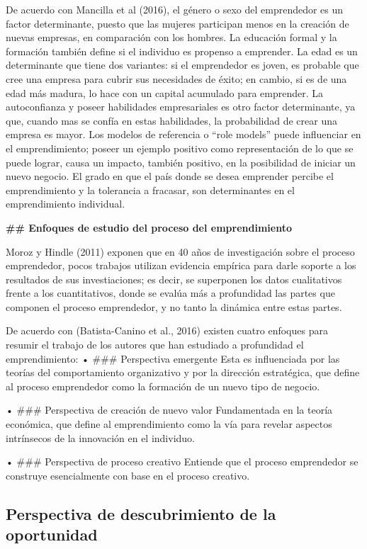 \documentclass[
  letterpaper,
  DIV=11,
  numbers=noendperiod]{scrreprt}
\begin{document}
De acuerdo con Mancilla et al (2016), el género o sexo del emprendedor
es un factor determinante, puesto que las mujeres participan menos en la
creación de nuevas empresas, en comparación con los hombres. La
educación formal y la formación también define si el individuo es
propenso a emprender. La edad es un determinante que tiene dos
variantes: si el emprendedor es joven, es probable que cree una empresa
para cubrir sus necesidades de éxito; en cambio, si es de una edad más
madura, lo hace con un capital acumulado para emprender. La
autoconfianza y poseer habilidades empresariales es otro factor
determinante, ya que, cuando mas se confía en estas habilidades, la
probabilidad de crear una empresa es mayor. Los modelos de referencia o
``role models'' puede influenciar en el emprendimiento; poseer un
ejemplo positivo como representación de lo que se puede lograr, causa un
impacto, también positivo, en la posibilidad de iniciar un nuevo
negocio. El grado en que el país donde se desea emprender percibe el
emprendimiento y la tolerancia a fracasar, son determinantes en el
emprendimiento individual.

\textbf{\#\# Enfoques de estudio del proceso del emprendimiento}

Moroz y Hindle (2011) exponen que en 40 años de investigación sobre el
proceso emprendedor, pocos trabajos utilizan evidencia empírica para
darle soporte a los resultados de sus investiaciones; es decir, se
superponen los datos cualitativos frente a los cuantitativos, donde se
evalúa más a profundidad las partes que componen el proceso emprendedor,
y no tanto la dinámica entre estas partes.

De acuerdo con (Batista-Canino et al., 2016) existen cuatro enfoques
para resumir el trabajo de los autores que han estudiado a profundidad
el emprendimiento: • \#\#\# Perspectiva emergente Esta es influenciada
por las teorías del comportamiento organizativo y por la dirección
estratégica, que define al proceso emprendedor como la formación de un
nuevo tipo de negocio.

• \#\#\# Perspectiva de creación de nuevo valor Fundamentada en la
teoría económica, que define al emprendimiento como la vía para revelar
aspectos intrínsecos de la innovación en el individuo.

• \#\#\# Perspectiva de proceso creativo Entiende que el proceso
emprendedor se construye esencialmente con base en el proceso creativo.

\hypertarget{perspectiva-de-descubrimiento-de-la-oportunidad}{%
\subsection{Perspectiva de descubrimiento de la
oportunidad}\label{perspectiva-de-descubrimiento-de-la-oportunidad}}
\end{document}
